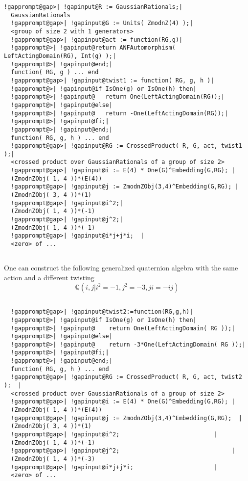 \documentclass[a4paper,11pt]{report}
\begin{document}
{{{\begin{Verbatim}[commandchars=!@|,fontsize=\small,frame=single,label=Example]
  !gapprompt@gap>| !gapinput@R := GaussianRationals;|
  GaussianRationals
  !gapprompt@gap>| !gapinput@G := Units( ZmodnZ(4) );|
  <group of size 2 with 1 generators>
  !gapprompt@gap>| !gapinput@act := function(RG,g)|
  !gapprompt@>| !gapinput@return ANFAutomorphism( LeftActingDomain(RG), Int(g) );|
  !gapprompt@>| !gapinput@end;|
  function( RG, g ) ... end
  !gapprompt@gap>| !gapinput@twist1 := function( RG, g, h )|
  !gapprompt@>| !gapinput@if IsOne(g) or IsOne(h) then|
  !gapprompt@>| !gapinput@   return One(LeftActingDomain(RG));|
  !gapprompt@>| !gapinput@else|
  !gapprompt@>| !gapinput@   return -One(LeftActingDomain(RG));|
  !gapprompt@>| !gapinput@fi;|
  !gapprompt@>| !gapinput@end;|
  function( RG, g, h ) ... end
  !gapprompt@gap>| !gapinput@RG := CrossedProduct( R, G, act, twist1 );|
  <crossed product over GaussianRationals of a group of size 2>
  !gapprompt@gap>| !gapinput@i := E(4) * One(G)^Embedding(G,RG); |
  (ZmodnZObj( 1, 4 ))*(E(4))
  !gapprompt@gap>| !gapinput@j := ZmodnZObj(3,4)^Embedding(G,RG); |
  (ZmodnZObj( 3, 4 ))*(1)
  !gapprompt@gap>| !gapinput@i^2;|
  (ZmodnZObj( 1, 4 ))*(-1)
  !gapprompt@gap>| !gapinput@j^2;|
  (ZmodnZObj( 1, 4 ))*(-1)
  !gapprompt@gap>| !gapinput@i*j+j*i;  |
  <zero> of ...
  
\end{Verbatim}
 One can construct the following generalized quaternion algebra with the same
action and a different twisting 
\[ {\ensuremath{\mathbb Q}} (i,j|i^2=-1,j^2=-3,ji=-ij) \]
 
\begin{Verbatim}[commandchars=!@|,fontsize=\small,frame=single,label=Example]
  
  !gapprompt@gap>| !gapinput@twist2:=function(RG,g,h)|
  !gapprompt@>| !gapinput@if IsOne(g) or IsOne(h) then|
  !gapprompt@>| !gapinput@    return One(LeftActingDomain( RG ));|
  !gapprompt@>| !gapinput@else|
  !gapprompt@>| !gapinput@    return -3*One(LeftActingDomain( RG ));|
  !gapprompt@>| !gapinput@fi;|
  !gapprompt@>| !gapinput@end;|
  function( RG, g, h ) ... end
  !gapprompt@gap>| !gapinput@RG := CrossedProduct( R, G, act, twist2 );  |
  <crossed product over GaussianRationals of a group of size 2>
  !gapprompt@gap>| !gapinput@i := E(4) * One(G)^Embedding(G,RG); |
  (ZmodnZObj( 1, 4 ))*(E(4))
  !gapprompt@gap>| !gapinput@j := ZmodnZObj(3,4)^Embedding(G,RG);  |
  (ZmodnZObj( 3, 4 ))*(1)
  !gapprompt@gap>| !gapinput@i^2;                           |
  (ZmodnZObj( 1, 4 ))*(-1)
  !gapprompt@gap>| !gapinput@j^2;                                |
  (ZmodnZObj( 1, 4 ))*(-3)
  !gapprompt@gap>| !gapinput@i*j+j*i;                       |
  <zero> of ...
  

\end{Verbatim}}}}
\end{document}

